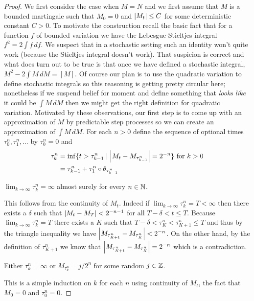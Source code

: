 \begin{proof}
We first consider the case when $M=N$ and we first assume that $M$ is a bounded martingale such that $M_0=0$ and $\left \vert M_t \right \vert \leq C$ for some deterministic constant $C > 0$.  To motivate the construction recall the basic fact that for a function $f$ of bounded variation we have the Lebesgue-Stieltjes integral $f^2 = 2 \int f \, df$.  We suspect that in a stochastic setting such an identity won't quite work (because the Stieltjes integral doesn't work).  That suspicion is correct and what does turn out to be true is that once we have defined a stochastic integral, $M^2 - 2 \int M \, dM = [M]$.  Of course our plan is to use the quadratic variation to define stochastic integrals so this reasoning is getting pretty circular here; nonetheless if we suspend belief for moment and define something that \emph{looks like} it could be $\int M \, dM$ then we might get the right definition for quadratic variation.  Motivated by these observations, our first step is to come up with an approximation of $M$ by predictable step processes so we can create an approximation of $\int M \, dM$.  For each $n > 0$ define the sequence of optional times $\tau^n_0, \tau^n_1, \dotsc$ by $\tau^n_0 = 0$ and 
\begin{align*} 
\tau^n_k &= \inf \lbrace t > \tau^n_{k-1} \mid \left \vert M_t - M_{\tau^n_{k-1}} \right \vert = 2^{-n} \rbrace \text{ for $k > 0$} \\
&=\tau^n_{k-1} + \tau^n_1 \circ \theta_{\tau^n_{k-1}}
\end{align*}

\begin{clm}$\lim_{k \to \infty} \tau^n_k = \infty$ almost surely for every $n \in \mathbb{N}$.
\end{clm}
This follows from the continuity of $M_t$.  Indeed if $\lim_{k \to \infty} \tau^n_k = T < \infty$ then there exists a $\delta$ such that $\left \vert M_t - M_T \right \vert < 2^{-n-1}$ for all $T-\delta < t \leq T$.  Because $\lim_{k \to \infty} \tau^n_k = T$ there exists a $K$ such that $T-\delta < \tau^n_K < \tau^n_{K+1} \leq T$ and thus by the triangle inequality we have $\left \vert M_{\tau^n_{K+1}} - M_{\tau^n_K} \right \vert < 2^{-n}$.  On the other hand, by the definition of $\tau^n_{K+1}$ we know that $\left \vert M_{\tau^n_{K+1}} - M_{\tau^n_K} \right \vert = 2^{-n}$ which is a contradiction.

\begin{clm}Either $\tau^n_k = \infty$ or $M_{\tau^n_k} = j/2^n$ for some random $j \in \mathbb{Z}$.
\end{clm}
This is a simple induction on $k$ for each $n$ using continuity of $M_t$, the fact that $M_0 = 0$ and $\tau^n_0=0$.


\end{proof}
